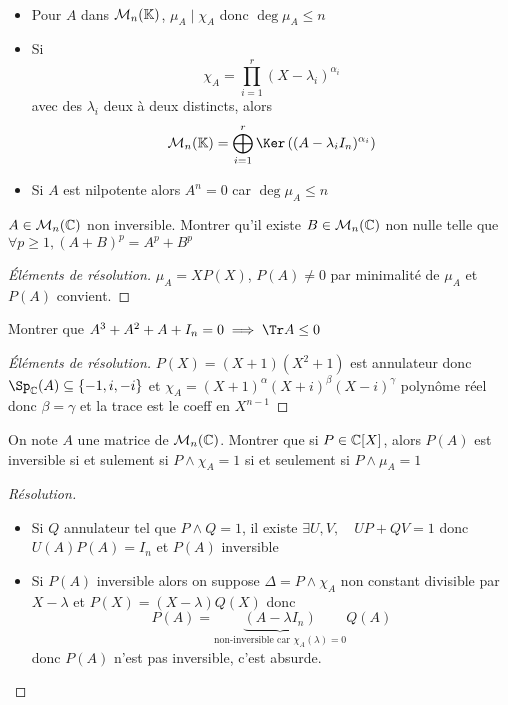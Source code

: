 \begin{csq*}~
    \begin{itemize}
        \item Pour $A$ dans $\mathcal M_n(\mathbb K)$, $\mu_A\;|\;\chi_A$ donc $\deg \mu_A\leq n$
        \item Si \[
                \chi_A=\prod_{i=1}^r(X-\lambda_i)^{\alpha_i}
            \]
            avec des $\lambda_i$ deux à deux distincts, alors \[
                \mathcal M_n(\K)=\bigoplus_{i=1}^r\Ker\left((A-\lambda_iI_n)^{\alpha_i}\right)
            \]
        \item Si $A$ est nilpotente alors $A^n=0$ car $\deg \mu_A\leq n$
    \end{itemize}
\end{csq*}

\begin{exo}
    $A\in\mathcal M_n(\mathbb C)$ non inversible. Montrer qu'il existe $B\in\mathcal M_n(\mathbb C)$ non nulle telle que $\forall p\geq 1, (A+B)^p=A^p+B^p$
\end{exo}

\begin{proof}[Éléments de résolution]
    $\mu_A=XP(X)$, $P(A)\neq 0$ par minimalité de $\mu_A$ et $P(A)$ convient.
\end{proof}

\begin{exo}
    Montrer que $A^3+A^2+A+I_n=0\implies \Tr A\leq 0$
\end{exo}
\begin{proof}[Éléments de résolution]
    $P(X)=(X+1)(X^2+1)$ est annulateur donc $\Sp_{\C}(A)\subseteq\{-1, i, -i\}$ et $\chi_A=(X+1)^{\alpha}(X+i)^{\beta}(X-i)^{\gamma}$ polynôme réel donc $\beta=\gamma$ et la trace est le coeff en $X^{n-1}$
\end{proof}

\begin{exo}
    On note $A$ une matrice de $\mathcal M_n(\mathbb C)$. Montrer que si $P\in\mathbb C[X]$, alors $P(A)$ est inversible si et sulement si $P\land \chi_A=1$ si et seulement si $P\land \mu_A=1$
\end{exo}

\begin{proof}[Résolution]~
    \begin{itemize}
        \item Si $Q$ annulateur tel que $P\land Q=1$, il existe $\exists U, V, \quad UP+QV=1$ donc $U(A)P(A)=I_n$ et $P(A)$ inversible
        \item Si $P(A)$ inversible alors on suppose $\Delta=P\land \chi_A$ non constant divisible par $X-\lambda$ et $P(X)=(X-\lambda)Q(X)$ donc \[
                P(A)=\underbrace{(A-\lambda I_n)}_{\text{non-inversible car }\chi_A(\lambda)=0}Q(A)
            \]
            donc $P(A)$ n'est pas inversible, c'est absurde.
    \end{itemize}
\end{proof}

